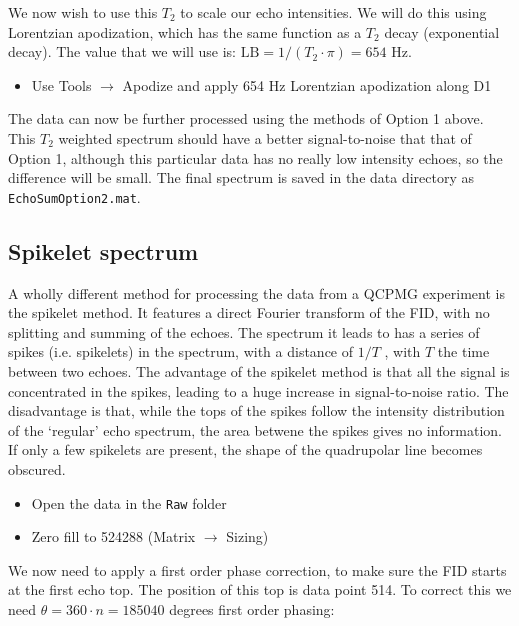 \documentclass[11pt,a4paper]{article}
\begin{document}
We now wish to use this $T_2$ to scale our echo intensities. We will do this using Lorentzian
apodization, which has the same function as a $T_2$ decay (exponential decay). The value that we
will use is: $\text{LB} = 1/(T_2 \cdot \pi) = 654$ Hz.


\begin{itemize}
  \item Use Tools $\longrightarrow$ Apodize and apply 654 Hz Lorentzian apodization along D1
\end{itemize}
The data can now be further processed using the methods of Option 1 above. This $T_2$ weighted
spectrum should have a better signal-to-noise that that of Option 1, although this particular data
has no really low intensity echoes, so the difference will be small. The final spectrum is saved in
the data directory as \texttt{EchoSumOption2.mat}.





\subsection{Spikelet spectrum}
A wholly different method for processing the data from a QCPMG experiment is the spikelet method. It
features a direct Fourier transform of the FID, with no splitting and summing of the echoes. The
spectrum it leads to has a series of spikes (i.e. spikelets) in the spectrum, with a distance of $1 /T$
, with $T$ the time between two echoes. The advantage of the spikelet method is that all the
signal is concentrated in the spikes, leading to a huge increase in signal-to-noise ratio. The disadvantage is
that, while the tops of the spikes follow the intensity distribution of the `regular' echo spectrum,
the area betwene the spikes gives no information. If only a few spikelets are present, the shape of
the quadrupolar line becomes obscured. 


\begin{itemize}
  \item Open the data in the \texttt{Raw} folder
	\item Zero fill to 524288 (Matrix $\longrightarrow$ Sizing)
\end{itemize}
We now need to apply a first order phase correction, to make sure the FID starts at the first echo
top. The position of this top is data point 514. To correct this we need $\theta = 360 \cdot n =
185040$ degrees first order phasing:
\end{document}
